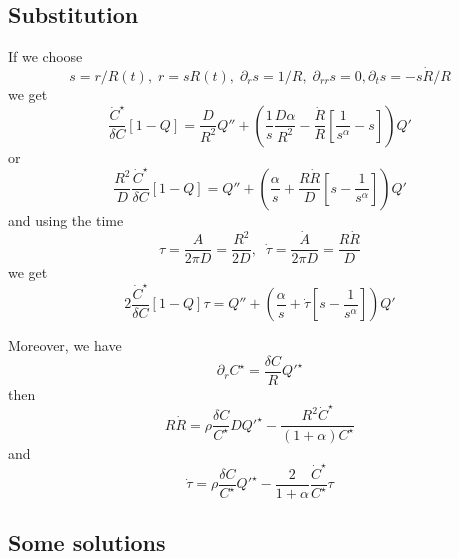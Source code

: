 \documentclass[11pt]{revtex4}
\begin{document}
\subsection{Substitution}
If we choose
\begin{equation}
	s = r/R(t),\; r = s R(t),\; \partial_r s = 1/R,\;\partial_{rr} s = 0, \partial_t s = - s \dot{R}/R
\end{equation}
we get
\begin{equation}
\dfrac{\dot{C}^\star}{\delta C} \left[1-Q\right] = \dfrac{D}{R^2} Q'' + 
\left( \dfrac{1}{s} \dfrac{D \alpha}{R^2} - \dfrac{\dot{R}}{R}\left[ \dfrac{1}{s^\alpha} - s \right]\right) Q'
\end{equation}
or
\begin{equation} 
\dfrac{R^2}{D}\dfrac{\dot{C}^\star}{\delta C} \left[1-Q\right] = Q'' + \left( \dfrac{\alpha}{s} + \dfrac{R\dot{R}}{D} \left[s-\dfrac{1}{s^\alpha}\right]\right) Q'
\end{equation}
and using the time
\begin{equation}
	\tau = \dfrac{A}{2\pi D} = \dfrac{R^2}{2D}, \;\; \dot{\tau} = \dfrac{\dot{A}}{2\pi D} = \dfrac{R\dot{R}}{D}
\end{equation}
we get
\begin{equation}
	2\dfrac{\dot{C}^\star}{\delta C} \left[1-Q\right] \tau = Q'' + \left( \dfrac{\alpha}{s} + \dot{\tau} \left[s-\dfrac{1}{s^\alpha}\right]\right) Q'
\end{equation}

Moreover, we have
\begin{equation}
	\partial_r C^\star = \dfrac{\delta C}{R} Q'^\star
\end{equation}
then
\begin{equation}
	R \dot{R} = \rho \dfrac{\delta C}{C^\star} D Q'^\star - \dfrac{R^2\dot{C}^\star}{\left(1+\alpha\right)C^\star}
\end{equation}
and
\begin{equation}
\dot{\tau} = \rho \dfrac{\delta C}{C^\star} Q'^\star - \dfrac{2}{1+\alpha} \dfrac{\dot{C}^\star}{C^\star} \tau
\end{equation}

\subsection{Some solutions}
\end{document}
